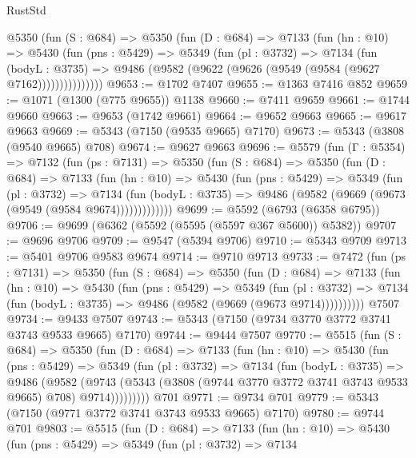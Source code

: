 \begin{lexlean}{RustStd}
\begin{coremodule}
        @5350
          (fun (S : @684) =>
          @5350
            (fun (D : @684) =>
            @7133
              (fun (hn : @10) =>
              @5430
                (fun (pns : @5429) =>
                @5349
                  (fun (pl : @3732) =>
                  @7134
                    (fun (bodyL : @3735) =>
                    @9486 (@9582 (@9622 (@9626 (@9549 (@9584 (@9627 @7162)))))))))))))))
@9653 := @1702 @7407
@9655 := @1363 @7416 @852
@9659 := @1071 (@1300 (@775 @9655)) @1138
@9660 := @7411 @9659
@9661 := @1744 @9660
@9663 := @9653 (@1742 @9661)
@9664 := @9652 @9663
@9665 := @9617 @9663
@9669 := @5343 (@7150 (@9535 @9665) @7170)
@9673 := @5343 (@3808 (@9540 @9665) @708)
@9674 := @9627 @9663
@9696 := @5579
    (fun (Γ : @5354) =>
    @7132
      (fun (ps : @7131) =>
      @5350
        (fun (S : @684) =>
        @5350
          (fun (D : @684) =>
          @7133
            (fun (hn : @10) =>
            @5430
              (fun (pns : @5429) =>
              @5349
                (fun (pl : @3732) =>
                @7134
                  (fun (bodyL : @3735) =>
                  @9486 (@9582 (@9669 (@9673 (@9549 (@9584 @9674)))))))))))))
@9699 := @5592 (@6793 (@6358 @6795))
@9706 := @9699 (@6362 (@5592 (@5595 (@5597 @367 @5600)) @5382))
@9707 := @9696 @9706
@9709 := @9547 (@5394 @9706)
@9710 := @5343 @9709
@9713 := @5401 @9706 @9583 @9674
@9714 := @9710 @9713
@9733 := @7472
    (fun (ps : @7131) =>
    @5350
      (fun (S : @684) =>
      @5350
        (fun (D : @684) =>
        @7133
          (fun (hn : @10) =>
          @5430
            (fun (pns : @5429) =>
            @5349
              (fun (pl : @3732) =>
              @7134 (fun (bodyL : @3735) => @9486 (@9582 (@9669 (@9673 @9714))))))))))
    @7507
@9734 := @9433 @7507
@9743 := @5343 (@7150 (@9734 @3770 @3772 @3741 @3743 @9533 @9665) @7170)
@9744 := @9444 @7507
@9770 := @5515
    (fun (S : @684) =>
    @5350
      (fun (D : @684) =>
      @7133
        (fun (hn : @10) =>
        @5430
          (fun (pns : @5429) =>
          @5349
            (fun (pl : @3732) =>
            @7134
              (fun (bodyL : @3735) =>
              @9486
                (@9582
                  (@9743
                    (@5343 (@3808 (@9744 @3770 @3772 @3741 @3743 @9533 @9665) @708) @9714)))))))))
    @701
@9771 := @9734 @701
@9779 := @5343 (@7150 (@9771 @3772 @3741 @3743 @9533 @9665) @7170)
@9780 := @9744 @701
@9803 := @5515
    (fun (D : @684) =>
    @7133
      (fun (hn : @10) =>
      @5430
        (fun (pns : @5429) =>
        @5349
          (fun (pl : @3732) =>
          @7134

\end{coremodule}
\end{lexlean}
